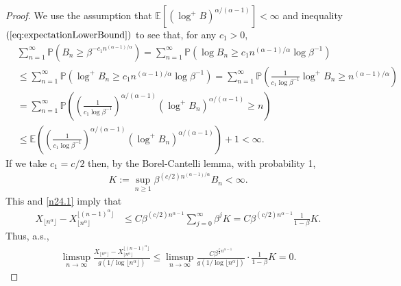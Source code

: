 \documentclass[bj]{imsart}
\numberwithin{equation}{section}
\renewcommand{\P}{\mathbb{P}}
\newcommand{\E}{\mathbb{E}}
\newcommand{\1}{\mathbf{1}}
\theoremstyle{definition}
\begin{document}
\begin{proof}
We use the assumption that $\E[(\log^+ B)^{\alpha/(\alpha-1)}]<\infty$ and inequality $(\ref{eq:expectationLowerBound})$ to see that, for any $c_1>0$,
\begin{align*}
&\sum_{n=1}^{\infty}\P\left( B_n\geq  \beta^{-c_1n^{(\alpha-1)/\alpha}}\right)
=\sum_{n=1}^{\infty}\P\left(\log B_n\geq   c_1n^{(\alpha-1)/\alpha}\log \beta^{-1}\right)\\
&\leq \sum_{n=1}^{\infty}\P\left(\log^+ B_n\geq   c_1n^{(\alpha-1)/\alpha}\log \beta^{-1}\right)
= \sum_{n=1}^{\infty}\P\left(
\frac{ 1}{ c_1 \log \beta^{-1}} \log^+ B_n\geq   n^{(\alpha-1)/\alpha}\right)\\
&= \sum_{n=1}^{\infty}\P\left(\left(
\frac{ 1}{ c_1 \log \beta^{-1}}\right)^{\alpha/(\alpha-1)} 
\left(\log^+ B_n\right)^{\alpha/(\alpha-1)}\geq   n\right)\\
&\leq \E\left (\left(
\frac{ 1}{ c_1 \log \beta^{-1}}\right)^{\alpha/(\alpha-1)} 
\left(\log^+ B_n\right)^{\alpha/(\alpha-1)}\right)+1
<\infty.
\end{align*}
If we take $c_1=c/2$ then, by the Borel-Cantelli lemma, 
with probability 1,
\begin{align*}
 K:= \sup_{n\geq 1} \beta^{(c/2) n^{(\alpha-1)/\alpha}}B_n
< \infty.
\end{align*}
This and \eqref{n24.1} imply that 
\begin{align*}
 X_{\lfloor n^\alpha \rfloor}-X_{\lfloor n^\alpha \rfloor}^{\lfloor (n-1)^\alpha \rfloor} &\leq  C\beta^{(c/2)n^{\alpha-1}}\sum_{j=0}^\infty \beta^{j}  K
= C\beta^{(c/2)n^{\alpha-1}}\frac 1 {1-\beta} K.
\end{align*}
Thus, a.s.,
\begin{align*}
\limsup_{n\to \infty}
\frac{X_{\lfloor n^\alpha \rfloor}-X_{\lfloor n^\alpha \rfloor}^{\lfloor (n-1)^\alpha \rfloor}}{g(1/\log \lfloor n^\alpha \rfloor)} 
\leq
\limsup_{n\to \infty}
\frac{C\beta^{\frac{c}{2}n^{\alpha-1}}}{ g(1/\log \lfloor n^\alpha \rfloor)} \cdot \frac 1 {1-\beta} K =0.
\end{align*}
\end{proof}
\end{document}
